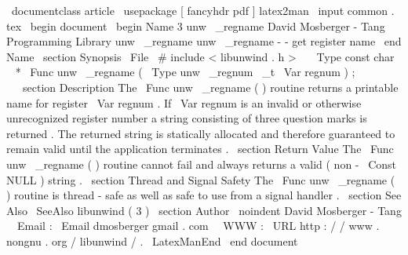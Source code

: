\
documentclass
{
article
}
\
usepackage
[
fancyhdr
pdf
]
{
latex2man
}
\
input
{
common
.
tex
}
\
begin
{
document
}
\
begin
{
Name
}
{
3
}
{
unw
\
_regname
}
{
David
Mosberger
-
Tang
}
{
Programming
Library
}
{
unw
\
_regname
}
unw
\
_regname
-
-
get
register
name
\
end
{
Name
}
\
section
{
Synopsis
}
\
File
{
\
#
include
<
libunwind
.
h
>
}
\
\
\
Type
{
const
char
~
*
}
\
Func
{
unw
\
_regname
}
(
\
Type
{
unw
\
_regnum
\
_t
}
\
Var
{
regnum
}
)
;
\
\
\
section
{
Description
}
The
\
Func
{
unw
\
_regname
}
(
)
routine
returns
a
printable
name
for
register
\
Var
{
regnum
}
.
If
\
Var
{
regnum
}
is
an
invalid
or
otherwise
unrecognized
register
number
a
string
consisting
of
three
question
marks
is
returned
.
The
returned
string
is
statically
allocated
and
therefore
guaranteed
to
remain
valid
until
the
application
terminates
.
\
section
{
Return
Value
}
The
\
Func
{
unw
\
_regname
}
(
)
routine
cannot
fail
and
always
returns
a
valid
(
non
-
\
Const
{
NULL
}
)
string
.
\
section
{
Thread
and
Signal
Safety
}
The
\
Func
{
unw
\
_regname
}
(
)
routine
is
thread
-
safe
as
well
as
safe
to
use
from
a
signal
handler
.
\
section
{
See
Also
}
\
SeeAlso
{
libunwind
(
3
)
}
\
section
{
Author
}
\
noindent
David
Mosberger
-
Tang
\
\
Email
:
\
Email
{
dmosberger
gmail
.
com
}
\
\
WWW
:
\
URL
{
http
:
/
/
www
.
nongnu
.
org
/
libunwind
/
}
.
\
LatexManEnd
\
end
{
document
}
